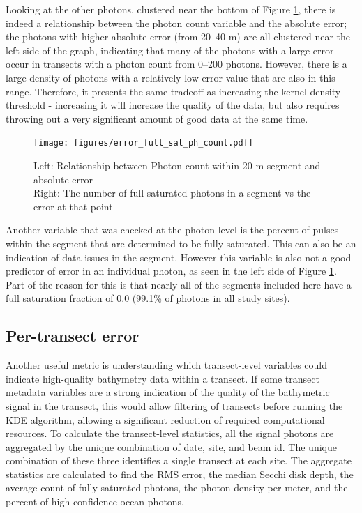 Looking at the other photons, clustered near the bottom of Figure \ref{fig:error-photon}, there is indeed a relationship between the photon count variable and the absolute error; the photons with higher absolute error (from 20--40 m) are all clustered near the left side of the graph, indicating that many of the photons with a large error occur in transects with a photon count from 0--200 photons. However, there is a large density of photons with a relatively low error value that are also in this range. Therefore, it presents the same tradeoff as increasing the kernel density threshold - increasing it will increase the quality of the data, but also requires throwing out a very significant amount of good data at the same time.

\begin{figure}[!ht]
    \centering
    \texttt{[image: figures/error\_full\_sat\_ph\_count.pdf]}
    \caption[Photon error vs segment photon count and the fraction of fully-saturated returns in the segment]{Left: Relationship between Photon count within 20 m segment and absolute error \\ Right: The number of full saturated photons in a segment vs the error at that point}
    \label{fig:error-photon}
\end{figure}

Another variable that was checked at the photon level is the percent of pulses within the segment that are determined to be fully saturated. This can also be an indication of data issues in the segment. However this variable is also not a good predictor of error in an individual photon, as seen in the left side of Figure \ref{fig:error-photon}. Part of the reason for this is that nearly all of the segments included here have a full saturation fraction of 0.0 (99.1\% of photons in all study sites).

\subsection{Per-transect error}

Another useful metric is understanding which transect-level variables could indicate high-quality bathymetry data within a transect. If some transect metadata variables are a strong indication of the quality of the bathymetric signal in the transect, this would allow filtering of transects before running the KDE algorithm, allowing a significant reduction of required computational resources. To calculate the transect-level statistics, all the signal photons are aggregated by the unique combination of date, site, and beam id. The unique combination of these three identifies a single transect at each site. The aggregate statistics are calculated to find the RMS error, the median Secchi disk depth, the average count of fully saturated photons, the photon density per meter, and the percent of high-confidence ocean photons. 

